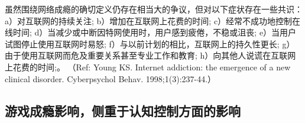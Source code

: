 虽然围绕网络成瘾的确切定义仍存在相当大的争议，但对以下症状存在一些共识：a）对互联网的持续关注; b）增加在互联网上花费的时间; c）经常不成功地控制在线时间; d）当减少或中断因特网使用时，用户感到疲倦，不稳或沮丧; e）当用户试图停止使用互联网时易怒; f）与以前计划的相比，互联网上的持久性更长; g）由于使用互联网而危及重要关系甚至专业工作和教育; h）向其他人说谎在互联网上花费的时间;。
（Ref: Young KS. Internet addiction: the emergence of a new clinical disorder. Cyberpsychol Behav. 1998;1(3):237-44.）





\subsection{游戏成瘾影响，侧重于认知控制方面的影响}

